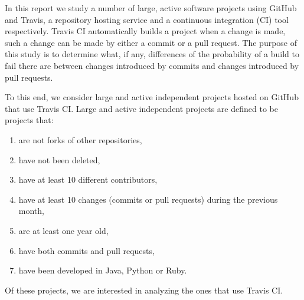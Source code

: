 In this report we study a number of large, active software projects using GitHub and Travis, a repository hosting service and a continuous integration (CI) tool respectively.
Travis CI automatically builds a project when a change is made, such a change can be made by either a commit or a pull request.
The purpose of this study is to determine what, if any, differences of the probability of a build to fail there are between changes introduced by commits and changes introduced by pull requests.

To this end, we consider large and active independent projects hosted on GitHub that use Travis CI.
Large and active independent projects are defined to be projects that:
\begin{enumerate}
\item are not forks of other repositories,
\item have not been deleted,
\item have at least 10 different contributors,
\item have at least 10 changes (commits or pull requests) during the previous month,
\item are at least one year old,
\item have both commits and pull requests,
\item have been developed in Java, Python or Ruby.
\end{enumerate}
Of these projects, we are interested in analyzing the ones that use Travis CI.

